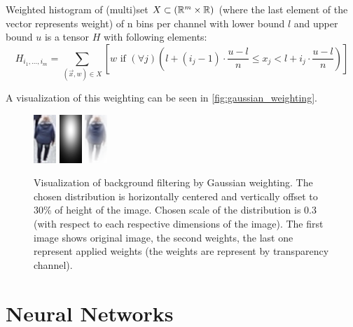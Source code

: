 \begin{defn}
\label{defn:weighted_histogram}
Weighted histogram of (multi)set $X \subset (\mathbb{R}^m \times \mathbb{R})$ (where the last
element of the vector represents weight) of n bins per channel with
lower bound $l$ and upper bound $u$ is a tensor $H$ with following elements:
$$H_{i_1, \ldots, i_m} = \sum_{(\vec{x}, w) \in X} \left[w \text{ if } (\forall j) \left(l + (i_j-1) \cdot \frac{u-l}{n} \leq x_j < l + i_j \cdot \frac{u-l}{n}\right)\right]$$
\end{defn}

A visualization of this weighting can be seen in \autoref{fig:gaussian_weighting}.

\begin{figure}
    \centering
    \includegraphics{img/background_filter/1_original.png} \hspace{1cm} \includegraphics{img/background_filter/weights.png} \hspace{1cm}
    \includegraphics{img/background_filter/weights_applied.png}
    \caption[Visualization of background filtering by Gaussian weighting]{Visualization of background filtering by Gaussian weighting. The chosen distribution is horizontally centered and vertically offset to 30\% of height of the image. Chosen scale of the distribution is 0.3 (with respect to each respective dimensions of the image). The first image shows original image, the second weights, the last one represent applied weights (the weights are represent by transparency channel).}
    \label{fig:gaussian_weighting}
\end{figure}


\section{Neural Networks}

